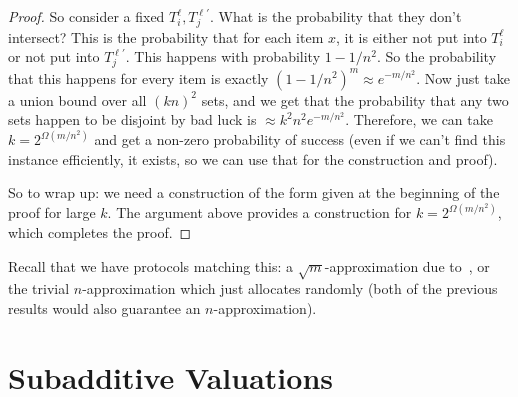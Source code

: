 \begin{proof}
    So consider a fixed $T_i^\ell, T_j^{\ell'}$. What is the probability that they
    don't intersect? This is the probability that for each item $x$, it is either
    not put into $T_i^\ell$ or not put into $T_j^{\ell'}$. This happens with
    probability $1-1/n^2$. So the probability that this happens for every item is
    exactly $(1-1/n^2)^m \approx e^{-m/n^2}$. Now just take a union bound over all
    $(kn)^2$ sets, and we get that the probability that any two sets happen to be
    disjoint by bad luck is $\approx k^2n^2 e^{-m/n^2}$. Therefore, we can take $k =
    2^{\Omega(m/n^2)}$ and get a non-zero probability of success (even if we can't
    find this instance efficiently, it exists, so we can use that for the
    construction and proof). 

    So to wrap up: we need a construction of the form given
    at the beginning of the proof
    for large $k$. The argument above provides a construction for $k =
    2^{\Omega(m/n^2)}$, which completes the proof.
  \end{proof}

  Recall that we have protocols matching this: a $\sqrt{m}$-approximation due
  to~\cite{LaviS05, DobzinskiNS05}, or the trivial $n$-approximation which just
  allocates randomly (both of the previous results would also guarantee an
  $n$-approximation). 

\section{Subadditive Valuations} 

